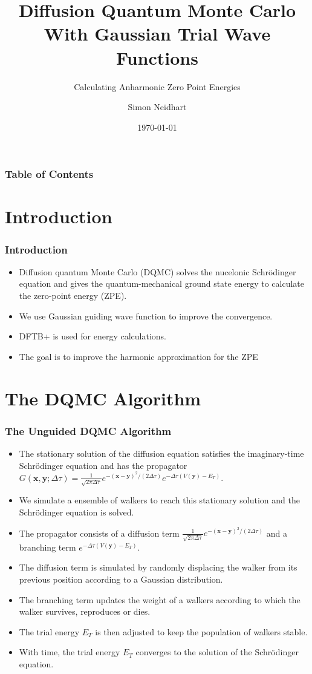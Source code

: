 \documentclass[16pt]{beamer}
\title{Diffusion Quantum Monte Carlo With Gaussian Trial Wave Functions}
\subtitle{Calculating Anharmonic Zero Point Energies}
\author{Simon Neidhart}
\institute{Department of Physics, University of Basel}
\date{\today}
\begin{document}
\frame{\titlepage}

\begin{frame}
\frametitle{Table of Contents}
\tableofcontents
\end{frame}

\section{Introduction}
\begin{frame}
\frametitle{Introduction}
\begin{itemize}
\item Diffusion quantum Monte Carlo (DQMC) solves the nucelonic Schrödinger equation and gives the quantum-mechanical ground state energy to calculate the zero-point energy (ZPE).
\item We use Gaussian guiding wave function to improve the convergence.
\item DFTB+ is used for energy calculations.
\item The goal is to improve the harmonic approximation for the ZPE
\end{itemize}
\end{frame}

\section{The DQMC Algorithm}
\begin{frame}
\frametitle{The Unguided DQMC Algorithm}
\begin{itemize}
\item The stationary solution of the diffusion equation satisfies the imaginary-time Schrödinger equation and has the propagator $G(\bm{x},\bm{y};\Delta \tau) = \frac{1}{\sqrt{2 \pi \Delta \tau}} e^{-(\bm{x}-\bm{y})^2/(2\Delta \tau)} e^{-\Delta \tau (V(\bm{y}) - E_T)}$.
\item We simulate a ensemble of walkers to reach this stationary solution and the Schrödinger equation is solved.
\item The propagator consists of a diffusion term $\frac{1}{\sqrt{2 \pi \Delta \tau}} e^{-(\bm{x}-\bm{y})^2/(2\Delta \tau)}$ and a branching term $e^{-\Delta \tau (V(\bm{y}) - E_T)}$.
\item The diffusion term is simulated by randomly displacing the walker from its previous position according to a Gaussian distribution.
\item The branching term updates the weight of a walkers according to which the walker survives, reproduces or dies.
\item The trial energy $E_T$ is then adjusted to keep the population of walkers stable.
\item With time, the trial energy $E_T$ converges to the solution of the Schrödinger equation.
\end{itemize}
\end{frame}
\end{document}
